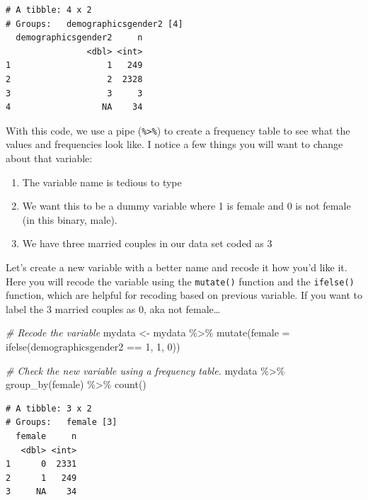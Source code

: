 \documentclass[
]{book}
\newenvironment{Shaded}{\begin{snugshade}}{\end{snugshade}}
\newcommand{\AttributeTok}[1]{\textcolor[rgb]{0.77,0.63,0.00}{#1}}
\newcommand{\CommentTok}[1]{\textcolor[rgb]{0.56,0.35,0.01}{\textit{#1}}}
\newcommand{\DecValTok}[1]{\textcolor[rgb]{0.00,0.00,0.81}{#1}}
\newcommand{\FunctionTok}[1]{\textcolor[rgb]{0.00,0.00,0.00}{#1}}
\newcommand{\NormalTok}[1]{#1}
\newcommand{\OtherTok}[1]{\textcolor[rgb]{0.56,0.35,0.01}{#1}}
\newcommand{\SpecialCharTok}[1]{\textcolor[rgb]{0.00,0.00,0.00}{#1}}
\providecommand{\tightlist}{%
  \setlength{\itemsep}{0pt}\setlength{\parskip}{0pt}}
\begin{document}
\begin{verbatim}
# A tibble: 4 x 2
# Groups:   demographicsgender2 [4]
  demographicsgender2     n
                <dbl> <int>
1                   1   249
2                   2  2328
3                   3     3
4                  NA    34
\end{verbatim}

With this code, we use a pipe (\texttt{\%\textgreater{}\%}) to create a frequency table to see what the values and frequencies look like. I notice a few things you will want to change about that variable:

\begin{enumerate}
\def\labelenumi{\alph{enumi})}
\tightlist
\item
  The variable name is tedious to type
\item
  We want this to be a dummy variable where 1 is female and 0 is not female (in this binary, male).
\item
  We have three married couples in our data set coded as 3
\end{enumerate}

Let's create a new variable with a better name and recode it how you'd like it.
Here you will recode the variable using the \texttt{mutate()} function and the \texttt{ifelse()} function, which are helpful for recoding based on previous variable.
If you want to label the 3 married couples as 0, aka not female\ldots{}

\begin{Shaded}
\begin{Highlighting}[]
\CommentTok{\# Recode the variable}
\NormalTok{mydata }\OtherTok{\textless{}{-}}\NormalTok{ mydata }\SpecialCharTok{\%\textgreater{}\%}
  \FunctionTok{mutate}\NormalTok{(}\AttributeTok{female =} \FunctionTok{ifelse}\NormalTok{(demographicsgender2 }\SpecialCharTok{==} \DecValTok{1}\NormalTok{, }\DecValTok{1}\NormalTok{, }\DecValTok{0}\NormalTok{))}

\CommentTok{\# Check the new variable using a frequency table. }
\NormalTok{mydata }\SpecialCharTok{\%\textgreater{}\%}
  \FunctionTok{group\_by}\NormalTok{(female) }\SpecialCharTok{\%\textgreater{}\%}
  \FunctionTok{count}\NormalTok{()}
\end{Highlighting}
\end{Shaded}

\begin{verbatim}
# A tibble: 3 x 2
# Groups:   female [3]
  female     n
   <dbl> <int>
1      0  2331
2      1   249
3     NA    34
\end{verbatim}
\end{document}
